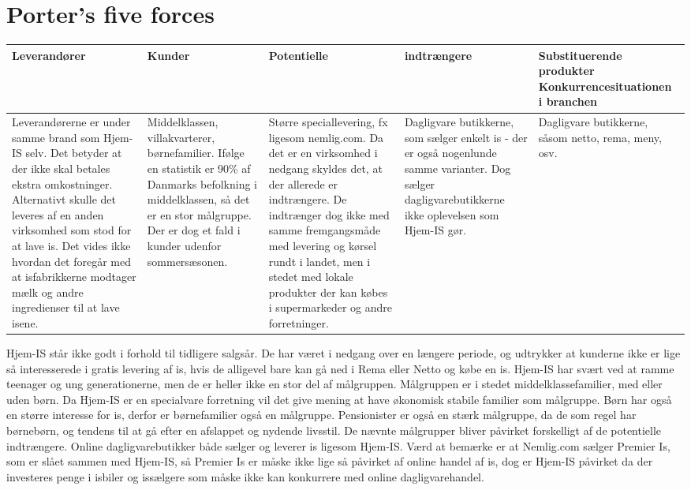 \section{Porter’s five forces}
\begin{center}
\begin{tabular}{ |p{80pt}|p{80pt}|p{80pt}|p{80pt}|p{80pt}| }
   \hline
   Leverandører & Kunder & Potentielle & indtrængere & Substituerende produkter	Konkurrencesituationen i branchen \\
   \hline\hline
   Leverandørerne er under samme brand som Hjem-IS selv. Det betyder at der ikke skal betales ekstra omkostninger. Alternativt skulle det leveres af en anden virksomhed som stod for at lave is.
	Det vides ikke hvordan det foregår med at isfabrikkerne modtager mælk og andre ingredienser til at lave isene.
	&
	Middelklassen, villakvarterer, børnefamilier.
	Ifølge en statistik er 90\% af Danmarks befolkning i middelklassen, så det er en stor målgruppe. Der er dog et fald i kunder udenfor sommersæsonen.
	&
	Større speciallevering, fx ligesom nemlig.com.
	Da det er en virksomhed i nedgang skyldes det, at der allerede er indtrængere. De indtrænger dog ikke med samme fremgangsmåde med levering og kørsel rundt i landet, men i stedet med lokale produkter der kan købes i supermarkeder og andre forretninger.
	&
	Dagligvare butikkerne, som sælger enkelt is - der er også nogenlunde samme varianter. Dog sælger dagligvarebutikkerne ikke oplevelsen som Hjem-IS gør.
	&
	Dagligvare butikkerne, såsom netto, rema, meny, osv.
	\\
	\hline
\end{tabular}
\end{center}

Hjem-IS står ikke godt i forhold til tidligere salgsår. De har været i nedgang over en længere periode, og udtrykker at kunderne ikke er lige så interesserede i gratis levering af is, hvis de alligevel bare kan gå ned i Rema eller Netto og købe en is. Hjem-IS har svært ved at ramme teenager og ung generationerne, men de er heller ikke en stor del af målgruppen. Målgruppen er i stedet middelklassefamilier, med eller uden børn. Da Hjem-IS er en specialvare forretning vil det give mening at have økonomisk stabile familier som målgruppe. Børn har også en større interesse for is, derfor er børnefamilier også en målgruppe. Pensionister er også en stærk målgruppe, da de som regel har børnebørn, og tendens til at gå efter en afslappet og nydende livsstil. 
De nævnte målgrupper bliver påvirket forskelligt af de potentielle indtrængere. Online dagligvarebutikker både sælger og leverer is ligesom Hjem-IS. Værd at bemærke er at Nemlig.com sælger Premier Is, som er slået sammen med Hjem-IS, så Premier Is er måske ikke lige så påvirket af online handel af is, dog er Hjem-IS påvirket da der investeres penge i isbiler og issælgere som måske ikke kan konkurrere med online dagligvarehandel.

